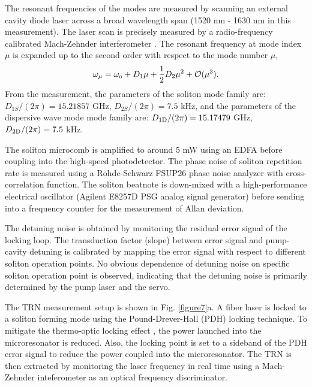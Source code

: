 \documentclass[noshowpacs,amsmath,
twocolumn,
superscriptaddress,
8pt,
aps,prb]{revtex4-2}
\begin{document}
\begin{footnotesize}
\medskip
{}

\noindent The resonant frequencies of the modes are measured by scanning an external cavity diode laser across a broad wavelength span (1520 nm - 1630 nm in this measurement). The laser scan is precisely measured by a radio-frequency calibrated Mach-Zehnder interferometer \cite{Li2012sideband,yi2015soliton}. The resonant frequency at mode index $\mu$ is expanded up to the second order with respect to the mode number $\mu$,
\begin{equation}
    \omega_{\mu}=\omega_{\rm o}+D_{1}\mu+\frac{1}{2}D_{2}\mu^{2}+\mathcal{O}(\mu^{3}).
\end{equation}
From the measurement, the parameters of the soliton mode family are: $D_{1S}/(2\pi)=15.21857$ GHz, $D_{2S}/(2\pi)=7.5$ kHz, and the parameters of the dispersive wave mode mode family are: $D_{1\rm D}/(2\pi)=15.17479$ GHz, $D_{2 \rm D}/(2\pi)=7.5$ kHz.

The soliton microcomb is amplified to around 5 mW using an EDFA before coupling into the high-speed photodetector. The phase noise of soliton repetition rate is measured using a Rohde-Schwarz FSUP26 phase noise analyzer with cross-correlation function. The soliton beatnote is down-mixed with a high-performance electrical oscillator (Agilent E8257D PSG analog signal generator) before sending into a frequency counter for the measurement of Allan deviation.

The detuning noise is obtained by monitoring the residual error signal of the locking loop. The transduction factor (slope) between error signal and pump-cavity detuning is calibrated by mapping the error signal with respect to different soliton operation points. No obvious dependence of detuning noise on specific soliton operation point is observed, indicating that the detuning noise is primarily determined by the pump laser and the servo.

The TRN measurement setup is shown in Fig. \ref{figure7}a. A fiber laser is locked to a soliton forming mode using the Pound-Drever-Hall (PDH) locking technique. To mitigate the thermo-optic locking effect \cite{carmon2004dynamical,li2014pump,drake2020thermal}, the power launched into the microresonator is reduced. Also, the locking point is set to a sideband of the PDH error signal to reduce the power coupled into the microresonator. The TRN is then extracted by monitoring the laser frequency in real time using a Mach-Zehnder inteferometer as an optical frequency discriminator. 


\end{footnotesize}
\end{document}

